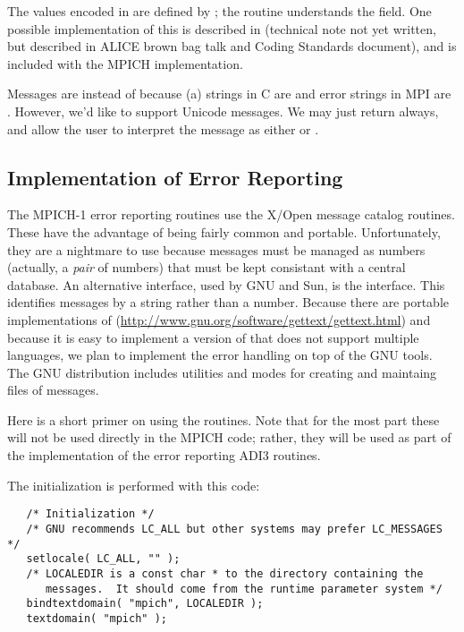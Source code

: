 \documentclass{article}
\begin{document}
The values encoded in  are defined by
; the routine 
understands the  field.  One possible implementation
of this is described in (technical note not yet written, but described
in ALICE brown bag talk and Coding Standards document), and is
included with the MPICH implementation.

Messages are  instead of  because (a)
strings in C are  and error strings in MPI are .  However, we'd like to support Unicode messages.  We may just
return  always, and allow the user to interpret the
message as either  or .



\subsection{Implementation of Error Reporting}
\label{sec:error-report-impl}
The MPICH-1 error reporting routines use the X/Open  message
catalog routines.  These have the advantage of being fairly common and
portable.  Unfortunately, they are a nightmare to use because messages must be
managed as numbers (actually, a \emph{pair} of numbers) that must be kept
consistant with a central database.  An 
alternative interface, used by GNU and Sun, is the  interface.
This identifies messages by a string rather than a number.
Because there are portable implementations of 
(\url{http://www.gnu.org/software/gettext/gettext.html}) and because it is
easy to implement a version of  that does not support multiple
languages, we plan to implement the error handling on top of the GNU
 tools.  The GNU  distribution includes utilities
and  modes for creating and maintaing files of messages.

Here is a short primer on using the  routines.  Note that for
the most part these will not be used directly in the MPICH code; rather, they
will be used as part of the implementation of the error reporting ADI3
routines.

The initialization is performed with this code:
\begin{verbatim}
   /* Initialization */
   /* GNU recommends LC_ALL but other systems may prefer LC_MESSAGES */
   setlocale( LC_ALL, "" );
   /* LOCALEDIR is a const char * to the directory containing the
      messages.  It should come from the runtime parameter system */
   bindtextdomain( "mpich", LOCALEDIR );
   textdomain( "mpich" );
\end{verbatim}
\end{document}
